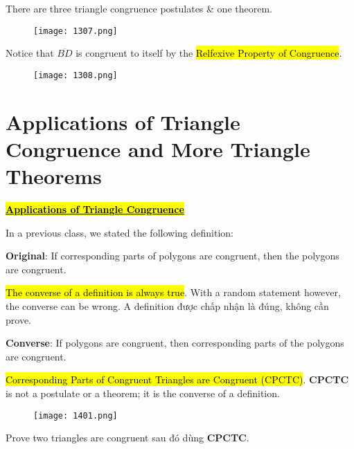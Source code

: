 There are three triangle congruence postulates \& one theorem.

\newpage

\begin{figure}[htb!]
  \centering
  \texttt{[image: 1307.png]}
\end{figure}

Notice that $\overline{BD}$ is congruent to itself by the \hl{Relfexive Property of Congruence}.

\newpage

\begin{figure}[htb!]
  \centering
  \texttt{[image: 1308.png]}
\end{figure}

\section{Applications of Triangle Congruence and More Triangle Theorems}

\vspace{.4cm}

\centerline{\underline{\hl{\textbf{\Large Applications of Triangle Congruence}}}}

In a previous class, we stated the following definition:

\textbf{Original}: If corresponding parts of polygons are congruent, then the polygons are congruent.

\hl{The converse of a definition is always true}. With a random statement however, the converse can be wrong. A definition được chấp nhận là đúng, không cần prove.

\textbf{Converse}: If polygons are congruent, then corresponding parts of the polygons are congruent.

\hl{Corresponding Parts of Congruent Triangles are Congruent (CPCTC)}. \textbf{CPCTC} is not a postulate or a theorem; it is the converse of a definition.

\newpage

\begin{figure}[htb!]
  \centering
  \texttt{[image: 1401.png]}
\end{figure}

Prove two triangles are congruent sau đó dùng \textbf{CPCTC}.
